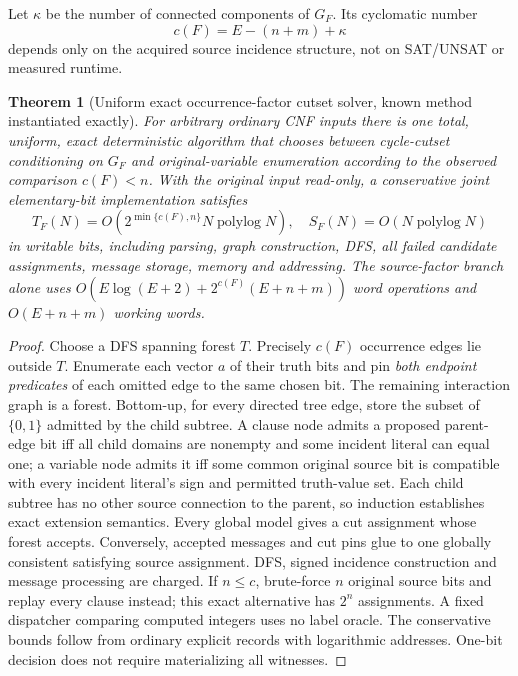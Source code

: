 \documentclass[11pt]{article}
\newtheorem{theorem}{Theorem}
\begin{document}
Let $\kappa$ be the number of connected components of $G_F$. Its cyclomatic number
\[
\boxed{c(F)=E-(n+m)+\kappa}
\]
depends only on the acquired source incidence structure, not on SAT/UNSAT or measured runtime.

\begin{theorem}[Uniform exact occurrence-factor cutset solver, known method instantiated exactly]
For arbitrary ordinary CNF inputs there is one total, uniform, exact deterministic algorithm that chooses between cycle-cutset conditioning on $G_F$ and original-variable enumeration according to the observed comparison $c(F)<n$. With the original input read-only, a conservative joint elementary-bit implementation satisfies
\[
T_F(N)=O\!\left(2^{\min\{c(F),n\}}N\operatorname{polylog}N\right),
\quad S_F(N)=O(N\operatorname{polylog}N)
\]
in writable bits, including parsing, graph construction, DFS, all failed candidate assignments, message storage, memory and addressing. The source-factor branch alone uses $O(E\log(E+2)+2^{c(F)}(E+n+m))$ word operations and $O(E+n+m)$ working words.
\end{theorem}
\begin{proof}
Choose a DFS spanning forest $T$. Precisely $c(F)$ occurrence edges lie outside $T$. Enumerate each vector $a$ of their truth bits and pin \emph{both endpoint predicates} of each omitted edge to the same chosen bit. The remaining interaction graph is a forest. Bottom-up, for every directed tree edge, store the subset of $\{0,1\}$ admitted by the child subtree. A clause node admits a proposed parent-edge bit iff all child domains are nonempty and some incident literal can equal one; a variable node admits it iff some common original source bit is compatible with every incident literal's sign and permitted truth-value set. Each child subtree has no other source connection to the parent, so induction establishes exact extension semantics. Every global model gives a cut assignment whose forest accepts. Conversely, accepted messages and cut pins glue to one globally consistent satisfying source assignment. DFS, signed incidence construction and message processing are charged. If $n\le c$, brute-force $n$ original source bits and replay every clause instead; this exact alternative has $2^n$ assignments. A fixed dispatcher comparing computed integers uses no label oracle. The conservative bounds follow from ordinary explicit records with logarithmic addresses. One-bit decision does not require materializing all witnesses.
\end{proof}
\end{document}

